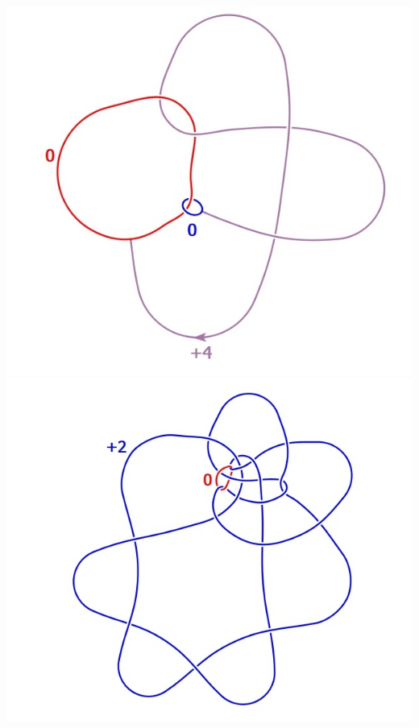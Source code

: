 \documentclass{beamer}
\theoremstyle{ex}
\theoremstyle{rem}
\begin{document}
\begin{frame}
\begin{itemize}
			\begin{center}
				\includegraphics[scale=0.4]{k_cup_c_example1}
				\includegraphics[scale=0.4]{k_cup_c_example2}
			\end{center}
		\end{itemize}
	\end{frame}
\end{document}
